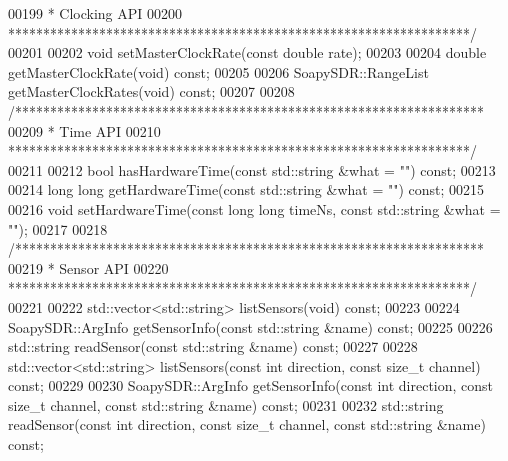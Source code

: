 \begin{DoxyCode}
00199 \textcolor{comment}{     * Clocking API}
00200 \textcolor{comment}{     ******************************************************************/}
00201 
00202     \textcolor{keywordtype}{void} setMasterClockRate(\textcolor{keyword}{const} \textcolor{keywordtype}{double} rate);
00203 
00204     \textcolor{keywordtype}{double} getMasterClockRate(\textcolor{keywordtype}{void}) \textcolor{keyword}{const};
00205 
00206     SoapySDR::RangeList getMasterClockRates(\textcolor{keywordtype}{void}) \textcolor{keyword}{const};
00207 
00208     \textcolor{comment}{/*******************************************************************}
00209 \textcolor{comment}{     * Time API}
00210 \textcolor{comment}{     ******************************************************************/}
00211 
00212     \textcolor{keywordtype}{bool} hasHardwareTime(\textcolor{keyword}{const} std::string &what = \textcolor{stringliteral}{""}) \textcolor{keyword}{const};
00213 
00214     \textcolor{keywordtype}{long} \textcolor{keywordtype}{long} getHardwareTime(\textcolor{keyword}{const} std::string &what = \textcolor{stringliteral}{""}) \textcolor{keyword}{const};
00215 
00216     \textcolor{keywordtype}{void} setHardwareTime(\textcolor{keyword}{const} \textcolor{keywordtype}{long} \textcolor{keywordtype}{long} timeNs, \textcolor{keyword}{const} std::string &what = \textcolor{stringliteral}{""});
00217 
00218     \textcolor{comment}{/*******************************************************************}
00219 \textcolor{comment}{     * Sensor API}
00220 \textcolor{comment}{     ******************************************************************/}
00221 
00222     std::vector<std::string> listSensors(\textcolor{keywordtype}{void}) \textcolor{keyword}{const};
00223 
00224     SoapySDR::ArgInfo getSensorInfo(\textcolor{keyword}{const} std::string &name) \textcolor{keyword}{const};
00225 
00226     std::string readSensor(\textcolor{keyword}{const} std::string &name) \textcolor{keyword}{const};
00227 
00228     std::vector<std::string> listSensors(\textcolor{keyword}{const} \textcolor{keywordtype}{int} direction, \textcolor{keyword}{const} \textcolor{keywordtype}{size\_t} channel) \textcolor{keyword}{const};
00229 
00230     SoapySDR::ArgInfo getSensorInfo(\textcolor{keyword}{const} \textcolor{keywordtype}{int} direction, \textcolor{keyword}{const} \textcolor{keywordtype}{size\_t} channel, \textcolor{keyword}{const} std::string &name) \textcolor{keyword}{
      const};
00231 
00232     std::string readSensor(\textcolor{keyword}{const} \textcolor{keywordtype}{int} direction, \textcolor{keyword}{const} \textcolor{keywordtype}{size\_t} channel, \textcolor{keyword}{const} std::string &name) \textcolor{keyword}{const};

\end{DoxyCode}
